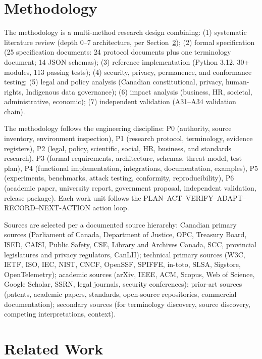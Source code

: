 \documentclass[11pt,a4paper]{article}
\begin{document}
\section{Methodology}
\label{sec:methodology}

The methodology is a multi-method research design combining: (1) systematic literature review (depth 0--7 architecture, per Section~\ref{sec:related-work}); (2) formal specification (25 specification documents: 24 protocol documents plus one terminology document; 14 JSON schemas); (3) reference implementation (Python 3.12, 30+ modules, 113 passing tests); (4) security, privacy, permanence, and conformance testing; (5) legal and policy analysis (Canadian constitutional, privacy, human-rights, Indigenous data governance); (6) impact analysis (business, HR, societal, administrative, economic); (7) independent validation (A31--A34 validation chain).

The methodology follows the engineering discipline: P0 (authority, source inventory, environment inspection), P1 (research protocol, terminology, evidence registers), P2 (legal, policy, scientific, social, HR, business, and standards research), P3 (formal requirements, architecture, schemas, threat model, test plan), P4 (functional implementation, integrations, documentation, examples), P5 (experiments, benchmarks, attack testing, conformity, reproducibility), P6 (academic paper, university report, government proposal, independent validation, release package). Each work unit follows the PLAN--ACT--VERIFY--ADAPT--RECORD--NEXT-ACTION action loop.

Sources are selected per a documented source hierarchy: Canadian primary sources (Parliament of Canada, Department of Justice, OPC, Treasury Board, ISED, CAISI, Public Safety, CSE, Library and Archives Canada, SCC, provincial legislatures and privacy regulators, CanLII); technical primary sources (W3C, IETF, ISO, IEC, NIST, CNCF, OpenSSF, SPIFFE, in-toto, SLSA, Sigstore, OpenTelemetry); academic sources (arXiv, IEEE, ACM, Scopus, Web of Science, Google Scholar, SSRN, legal journals, security conferences); prior-art sources (patents, academic papers, standards, open-source repositories, commercial documentation); secondary sources (for terminology discovery, source discovery, competing interpretations, context).

\section{Related Work}
\label{sec:related-work}
\end{document}
